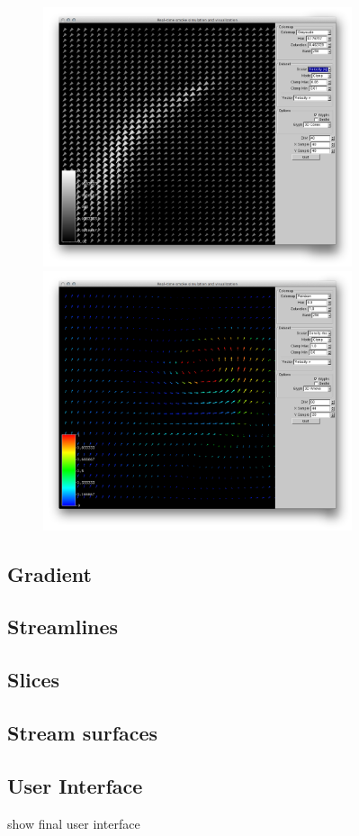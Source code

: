 \begin{figure}[htbp]
\centering
\begin{minipage}[t]{0.48\textwidth}
 \includegraphics[height=3in]{figures/glyph/conesVelocityGrayscale.png}
\caption{}
\label{fig:forceScaled}
\end{minipage}\hspace{.04\textwidth}%
\begin{minipage}[t]{0.48\textwidth}
\includegraphics[height=3in]{figures/glyph/arrowsDensityVelocityRainbow.png}
    \caption{}
    \label{}
\end{minipage}
\end{figure}

\subsection{Gradient}
\subsection{Streamlines}
\subsection{Slices}
\subsection{Stream surfaces}
\subsection{User Interface}
show final user interface
